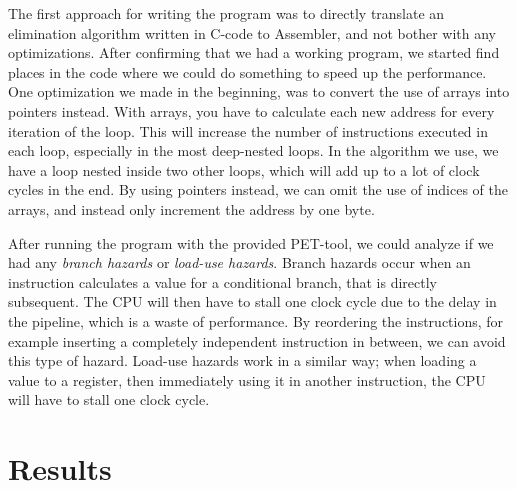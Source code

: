\documentclass[a4paper,9pt,fleqn]{article}
\begin{document}
The first approach for writing the program was to directly translate an elimination algorithm written in C-code to Assembler,
and not bother with any optimizations. After confirming that we had a working program, we started
find places in the code where we could do something to speed up the performance. One optimization we
made in the beginning, was to convert the use of arrays into pointers instead. With arrays, you have
to calculate each new address for every iteration of the loop. This will increase the number of
instructions executed in each loop, especially in the most deep-nested loops. In the algorithm we
use, we have a loop nested inside two other loops, which will add up to a lot of clock cycles in the
end. By using pointers instead, we can omit the use of indices of the arrays, and instead only
increment the address by one byte.

After running the program with the provided PET-tool, we could analyze if we had any {\it branch
hazards} or {\it load-use hazards}. Branch hazards occur when an instruction calculates a value
for a conditional branch, that is directly subsequent. The CPU will then have to stall one clock
cycle due to the delay in the pipeline, which is a waste of performance. By reordering the
instructions, for example inserting a completely independent instruction in between, we can avoid
this type of hazard. Load-use hazards work in a similar way; when loading a value to a register,
then immediately using it in another instruction, the CPU will have to stall one clock cycle.

\section{Results} \label{res}
\end{document}
